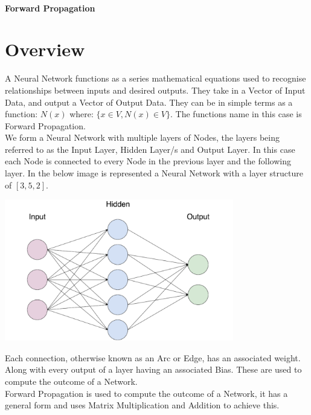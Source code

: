 \begin{flushleft}
            \subsubsection{Forward Propagation}
                \chapter{Overview}
                    \vspace{0.2cm}
                    A Neural Network functions as a series mathematical equations used to recognise relationships between inputs
                    and desired outputs. They take in a Vector of Input Data, and output a Vector of Output Data. They can be
                    in simple terms as a function: $N(x)$ where: $\{x \in V, N(x) \in V\}$. The functions name in this case is
                    Forward Propagation. \\
                    \vspace{0.2cm}
                    We form a Neural Network with multiple layers of Nodes, the layers being referred to as the Input Layer, 
                    Hidden Layer/s and Output Layer. In this case each Node is connected to every Node in the previous layer and
                    the following layer. In the below image is represented a Neural Network with a layer structure of $[3, 5, 2]$.

                    \vspace{0.1cm}
                    \centerline{\includegraphics[width=10cm]{Images/InitialResearch/NeuralNetworkExample.png}}

                    Each connection, otherwise known as an Arc or Edge, has an associated weight. Along with every output of a
                    layer having an associated Bias. These are used to compute the outcome of a Network. \\
                    \vspace{0.2cm}
                    Forward Propagation is used to compute the outcome of a Network, it has a general form and uses 
                    Matrix Multiplication and Addition to achieve this.
                    \vspace{0.2cm}
                    

\end{flushleft}
